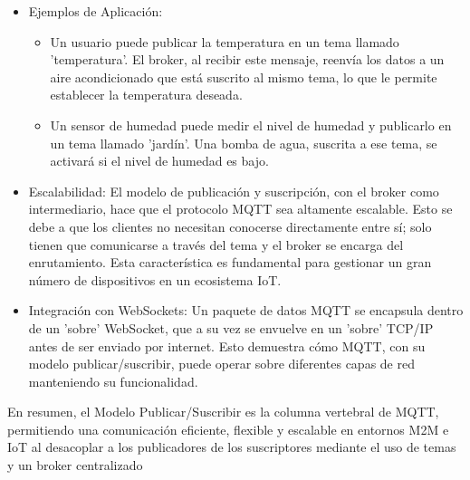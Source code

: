 \documentclass{report}
\begin{document}
\begin{itemize}
    \item Ejemplos de Aplicación:
        \begin{itemize}
            \item Un usuario puede publicar la temperatura en un tema llamado 'temperatura'. El broker, al recibir este mensaje, 
            reenvía los datos a un aire acondicionado que está suscrito al mismo tema, lo que le permite establecer la temperatura deseada.
            \item Un sensor de humedad puede medir el nivel de humedad y publicarlo en un tema llamado 'jardín'. 
            Una bomba de agua, suscrita a ese tema, se activará si el nivel de humedad es bajo.
        \end{itemize}
    \item Escalabilidad: El modelo de publicación y suscripción, con el broker como intermediario, hace que el protocolo MQTT sea altamente 
    escalable. Esto se debe a que los clientes no necesitan conocerse directamente entre sí; solo tienen que comunicarse a través del tema y 
    el broker se encarga del enrutamiento. Esta característica es fundamental para gestionar un gran número de dispositivos en un ecosistema IoT.
    \item Integración con WebSockets: Un paquete de datos MQTT se encapsula dentro de un 'sobre' WebSocket, que a su vez se 
    envuelve en un 'sobre' TCP/IP antes de ser enviado por internet. Esto demuestra cómo MQTT, con su modelo publicar/suscribir, 
    puede operar sobre diferentes capas de red manteniendo su funcionalidad.
\end{itemize}
En resumen, el Modelo Publicar/Suscribir es la columna vertebral de MQTT, permitiendo una comunicación eficiente, flexible y 
escalable en entornos M2M e IoT al desacoplar a los publicadores de los suscriptores mediante el uso de temas y 
un broker centralizado
\end{document}
